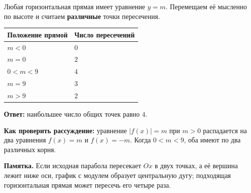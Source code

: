 \documentclass[a4paper,12pt]{article}
\begin{document}
Любая горизонтальная прямая имеет уравнение $y=m$. Перемещаем её мысленно по высоте и считаем \textbf{различные} точки пересечения.
\begin{center}
\renewcommand{\arraystretch}{1.25}
\begin{tabularx}{0.87\linewidth}{@{}>{\centering\arraybackslash}X>{\centering\arraybackslash}X@{}}
\toprule
Положение прямой & Число пересечений\\
\midrule
$m<0$ & $0$\\
$m=0$ & $2$\\
$0<m<9$ & $4$\\
$m=9$ & $3$\\
$m>9$ & $2$\\
\bottomrule
\end{tabularx}
\end{center}
\textbf{Ответ:} наибольшее число общих точек равно $\boxed{4}$.

\textbf{Как проверить рассуждение:} уравнение $|f(x)|=m$ при $m>0$ распадается на два уравнения $f(x)=m$ и $f(x)=-m$. Когда $0<m<9$, оба имеют по два различных корня.

\textbf{Памятка.} Если исходная парабола пересекает $Ox$ в двух точках, а её вершина лежит ниже оси, график с модулем образует центральную дугу; подходящая горизонтальная прямая может пересечь его четыре раза.
\end{document}
